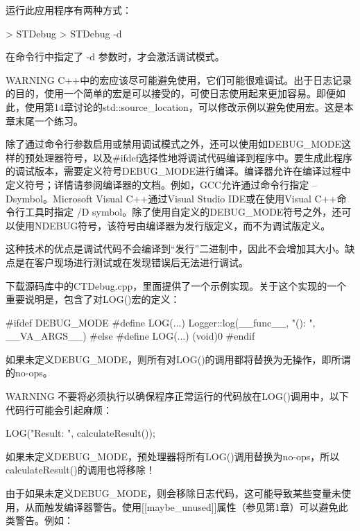 运行此应用程序有两种方式：

\begin{shell}
> STDebug
> STDebug -d
\end{shell}

在命令行中指定了 -d 参数时，才会激活调试模式。

\begin{myWarning}{WARNING}
C++中的宏应该尽可能避免使用，它们可能很难调试。出于日志记录的目的，使用一个简单的宏是可以接受的，可使日志使用起来更加容易。即便如此，使用第14章讨论的std::source\_location，可以修改示例以避免使用宏。这是本章末尾一个练习。
\end{myWarning}


除了通过命令行参数启用或禁用调试模式之外，还可以使用如DEBUG\_MODE这样的预处理器符号，以及\#ifdef选择性地将调试代码编译到程序中。要生成此程序的调试版本，需要定义符号DEBUG\_MODE进行编译。编译器允许在编译过程中定义符号；详情请参阅编译器的文档。例如，GCC允许通过命令行指定 –Dsymbol。Microsoft Visual C++通过Visual Studio IDE或在使用Visual C++命令行工具时指定 /D symbol。除了使用自定义的DEBUG\_MODE符号之外，还可以使用NDEBUG符号，该符号由编译器为发行版定义，而不为调试版定义。

这种技术的优点是调试代码不会编译到“发行”二进制中，因此不会增加其大小。缺点是在客户现场进行测试或在发现错误后无法进行调试。

下载源码库中的CTDebug.cpp，里面提供了一个示例实现。关于这个实现的一个重要说明是，包含了对LOG()宏的定义：

\begin{cpp}
#ifdef DEBUG_MODE
    #define LOG(...) Logger::log(__func__, "(): ", __VA_ARGS__)
#else
    #define LOG(...) (void)0
#endif
\end{cpp}

如果未定义DEBUG\_MODE，则所有对LOG()的调用都将替换为无操作，即所谓的no-ops。

\begin{myWarning}{WARNING}
不要将必须执行以确保程序正常运行的代码放在LOG()调用中，以下代码行可能会引起麻烦：

\begin{cpp}
LOG("Result: ", calculateResult());
\end{cpp}

如果未定义DEBUG\_MODE，预处理器将所有LOG()调用替换为no-ops，所以calculateResult()的调用也将移除！
\end{myWarning}

由于如果未定义DEBUG\_MODE，则会移除日志代码，这可能导致某些变量未使用，从而触发编译器警告。使用[[maybe\_unused]]属性（参见第1章）可以避免此类警告。例如：

